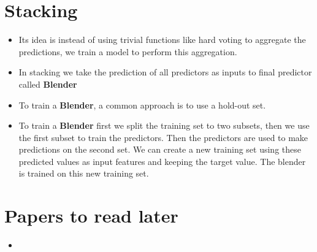 \documentclass{article}
\begin{document}
	\section{Stacking} 
	\begin{itemize}
		\item Its idea is instead of using trivial functions like hard voting to aggregate the predictions, we train a model to perform this aggregation.
		\item In stacking we take the prediction of all predictors as inputs to final predictor called \textbf{Blender}
		\item To train a \textbf{Blender}, a common approach is to use a hold-out set.
		\item To train a \textbf{Blender} first we split the training set to two subsets, then we use the first subset to train the predictors. Then the predictors are used to make predictions on the second set. We can create a new training set using these predicted values as input features and keeping the target value. The blender is trained on this new training set.
	\end{itemize}
	\section*{Papers to read later}
    \begin{itemize}
    	\item 
    \end{itemize}
\end{document}
